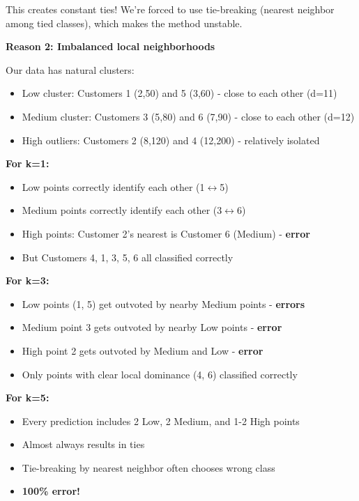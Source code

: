 \documentclass[12pt]{article}
\begin{document}
\begin{explanation}
This creates constant ties! We're forced to use tie-breaking (nearest neighbor among tied classes), which makes the method unstable.

\textbf{Reason 2: Imbalanced local neighborhoods}

Our data has natural clusters:
\begin{itemize}
    \item Low cluster: Customers 1 (2,50) and 5 (3,60) - close to each other (d=11)
    \item Medium cluster: Customers 3 (5,80) and 6 (7,90) - close to each other (d=12)
    \item High outliers: Customers 2 (8,120) and 4 (12,200) - relatively isolated
\end{itemize}

\textbf{For k=1:}
\begin{itemize}
    \item Low points correctly identify each other (1$\leftrightarrow$5)
    \item Medium points correctly identify each other (3$\leftrightarrow$6)
    \item High points: Customer 2's nearest is Customer 6 (Medium) - \textbf{error}
    \item But Customers 4, 1, 3, 5, 6 all classified correctly
\end{itemize}

\textbf{For k=3:}
\begin{itemize}
    \item Low points (1, 5) get outvoted by nearby Medium points - \textbf{errors}
    \item Medium point 3 gets outvoted by nearby Low points - \textbf{error}
    \item High point 2 gets outvoted by Medium and Low - \textbf{error}
    \item Only points with clear local dominance (4, 6) classified correctly
\end{itemize}

\textbf{For k=5:}
\begin{itemize}
    \item Every prediction includes 2 Low, 2 Medium, and 1-2 High points
    \item Almost always results in ties
    \item Tie-breaking by nearest neighbor often chooses wrong class
    \item \textbf{100\% error!}
\end{itemize}


\end{explanation}
\end{document}
